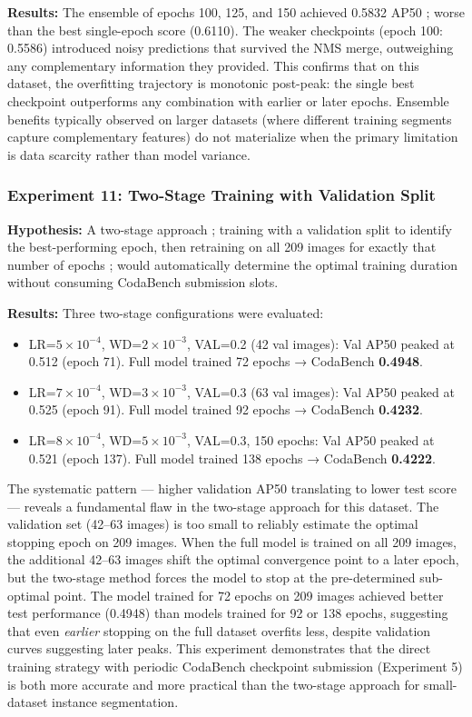 \documentclass[12pt, a4paper]{article}
\begin{document}
\textbf{Results:} The ensemble of epochs 100, 125, and 150 achieved 0.5832 AP50 ; worse than the best single-epoch score (0.6110). The weaker checkpoints (epoch 100: 0.5586) introduced noisy predictions that survived the NMS merge, outweighing any complementary information they provided. This confirms that on this dataset, the overfitting trajectory is monotonic post-peak: the single best checkpoint outperforms any combination with earlier or later epochs. Ensemble benefits typically observed on larger datasets (where different training segments capture complementary features) do not materialize when the primary limitation is data scarcity rather than model variance.

\subsubsection{Experiment 11: Two-Stage Training with Validation Split}
\textbf{Hypothesis:} A two-stage approach ; training with a validation split to identify the best-performing epoch, then retraining on all 209 images for exactly that number of epochs ; would automatically determine the optimal training duration without consuming CodaBench submission slots.

\textbf{Results:} Three two-stage configurations were evaluated:
\begin{itemize}
    \item LR=$5\times10^{-4}$, WD=$2\times10^{-3}$, VAL=0.2 (42 val images): Val AP50 peaked at 0.512 (epoch 71). Full model trained 72 epochs → CodaBench \textbf{0.4948}.
    \item LR=$7\times10^{-4}$, WD=$3\times10^{-3}$, VAL=0.3 (63 val images): Val AP50 peaked at 0.525 (epoch 91). Full model trained 92 epochs → CodaBench \textbf{0.4232}.
    \item LR=$8\times10^{-4}$, WD=$5\times10^{-3}$, VAL=0.3, 150 epochs: Val AP50 peaked at 0.521 (epoch 137). Full model trained 138 epochs → CodaBench \textbf{0.4222}.
\end{itemize}
The systematic pattern — higher validation AP50 translating to lower test score — reveals a fundamental flaw in the two-stage approach for this dataset. The validation set (42--63 images) is too small to reliably estimate the optimal stopping epoch on 209 images. When the full model is trained on all 209 images, the additional 42--63 images shift the optimal convergence point to a later epoch, but the two-stage method forces the model to stop at the pre-determined sub-optimal point. The model trained for 72 epochs on 209 images achieved better test performance (0.4948) than models trained for 92 or 138 epochs, suggesting that even \emph{earlier} stopping on the full dataset overfits less, despite validation curves suggesting later peaks. This experiment demonstrates that the direct training strategy with periodic CodaBench checkpoint submission (Experiment 5) is both more accurate and more practical than the two-stage approach for small-dataset instance segmentation.
\end{document}
